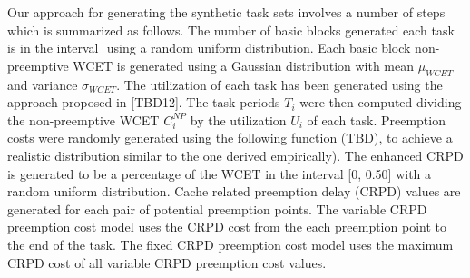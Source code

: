 Our approach for generating the synthetic task sets involves a number
of steps which is summarized as follows.  The number of basic blocks
generated each task is in the
interval \begin{math}[N_{i}(min),N_{i}(max)]\end{math} using a random
uniform distribution.  Each basic block non-preemptive WCET is
generated using a Gaussian distribution with
mean \begin{math}\mu_{WCET}\end{math} and
variance \begin{math}\sigma_{WCET}\end{math}.  The  utilization of
each task has been generated using the approach proposed in [TBD12].
The task periods \begin{math}T_{i}\end{math} were then computed
dividing the non-preemptive WCET \begin{math}C_{i}^{NP}\end{math} by
the utilization \begin{math}U_{i}\end{math} of each task.  Preemption
costs were randomly generated using the following function (TBD), to
achieve a realistic distribution similar to the one derived
empirically).  The enhanced CRPD is generated to be a percentage of
the WCET in the interval [0, 0.50] with a random uniform
distribution. Cache related preemption delay (CRPD) values are
generated for each pair of potential preemption points.  The variable
CRPD preemption cost model uses the CRPD cost from the each preemption
point to the end of the task. The fixed CRPD preemption cost model
uses the maximum CRPD cost of all variable CRPD preemption cost
values.  
